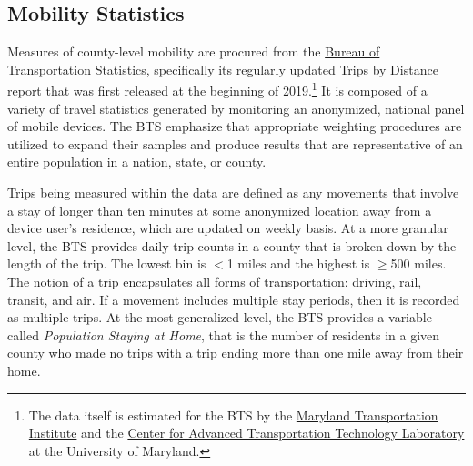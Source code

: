 \documentclass[11pt]{article} %
\begin{document}
\subsection{Mobility Statistics}
Measures of county-level mobility are procured from the \href{https://www.bts.gov/trips-distance-staying-home}{Bureau of Transportation Statistics}, specifically its regularly updated \href{https://data.bts.gov/Research-and-Statistics/Trips-by-Distance/w96p-f2qv}{Trips by Distance} report that was first released at the beginning of 2019.\footnote{The data itself is estimated for the BTS by the \href{https://mti.umd.edu/}{Maryland Transportation Institute} and the \href{https://www.cattlab.umd.edu/}{Center for Advanced Transportation Technology Laboratory} at the University of Maryland.} It is composed of a variety of travel statistics generated by monitoring an anonymized, national panel of mobile devices. The BTS emphasize that appropriate weighting procedures are utilized to expand their samples and produce results that are representative of an entire population in a nation, state, or county. 

Trips being measured within the data are defined as any movements that involve a stay of longer than ten minutes at some anonymized location away from a device user's residence, which are updated on weekly basis. At a more granular level, the BTS provides daily trip counts in a county that is broken down by the length of the trip. The lowest bin is $<$1 miles and the highest is $\geq$500 miles. The notion of a trip encapsulates all forms of transportation: driving, rail, transit, and air. If a movement includes multiple stay periods, then it is recorded as multiple trips. At the most generalized level, the BTS provides a variable called \textit{Population Staying at Home}, that is the number of residents in a given county who made no trips with a trip ending more than one mile away from their home. 
\end{document}
